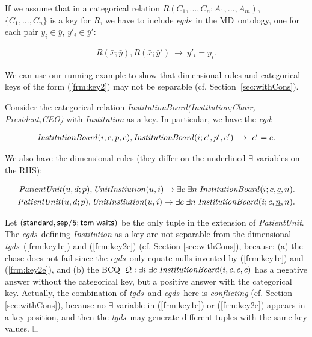 \documentclass[format=acmsmall, review=false, screen=true]{acmart}
\newcommand{\bcq}{BCQ}
\newcommand{\boxtheorem}{\ensuremath{\hfill \Box}}
\newcommand{\mc}[1]{\mathcal{ #1}}
\newcommand{\nit}[1]{{\it #1}}
\newcommand{\md}{MD}
\newcommand{\vectt}[1]{\bar{#1}}
\newcommand{\egds}{{\em egds}}
\newcommand{\egd}{{\em egd}}
\newcommand{\tgds}{{\em tgds}}
\begin{document}
 If we assume that in a categorical relation $R(C_1,...,C_n;A_1,...,A_m)$, \ $\{C_1,...,C_n\}$ is a key for $R$, we have to include  \egds \ in the \md \ ontology, one for each pair $y_i \in \vectt{y}$, $y'_i \in \vectt{y}'$:

\vspace{-4mm}
\begin{align}
R(\vectt{x};\vectt{y}),R(\vectt{x};\vectt{y}')~\rightarrow~ y'_i=y_i.\label{frm:key2}
\end{align}
\vspace{-4mm}



We can use our running example to show that dimensional rules and categorical keys of the form (\ref{frm:key2}) may  not be separable (cf. Section~\ref{sec:withCons}).

\begin{example} \label{ex:non-sep-ex}Consider the categorical relation \nit{InstitutionBoard(Institution;Chair,} \nit{President,CEO)} with \nit{Institution} as a key. In particular, we have the \egd:

\vspace{-4mm}
\begin{align*}
\nit{InstitutionBoard}(i;c,p,e),\nit{InstitutionBoard}(i;c',p',e')~\rightarrow~ c'=c.
\end{align*}
\vspace{-4mm}

We also have the dimensional rules (they differ on the underlined $\exists$-variables on the RHS):


\vspace{-4mm}
\begin{align}
\nit{PatientUnit}(u,d;p),\nit{UnitInstiution}(u,i) \rightarrow \exists c\;\exists n\;\nit{InstitutionBoard}(i;c,\underline{c},n).\label{frm:key1e}\\
\nit{PatientUnit}(u,d;p),\nit{UnitInstiution}(u,i) \rightarrow \exists c\;\exists n\;\nit{InstitutionBoard}(i;c,\underline{n},n).\label{frm:key2e}
\end{align}
\vspace{-4mm}

Let $({\sf standard},{\sf sep/5};{\sf tom\; waits})$ be the only tuple in the extension of \nit{PatientUnit}. The \egds \ defining \nit{Institution} as a key  are not separable from the dimensional \tgds \ (\ref{frm:key1e}) and (\ref{frm:key2e}) (cf. Section \ref{sec:withCons}), because: (a) the chase does not fail since the \egds \ only equate nulls invented by (\ref{frm:key1e}) and (\ref{frm:key2e}), and (b) the \bcq \ $\mc{Q}: \exists i\;\exists c\;\nit{InstitutionBoard}(i,c,c,c)$ has a negative answer without the categorical key, but a positive answer with the categorical key. Actually, the combination of \tgds \ and \egds \ here is {\em conflicting} (cf. Section \ref{sec:withCons}), because no $\exists$-variable in (\ref{frm:key1e}) or (\ref{frm:key2e}) appears in a key position, and then the \tgds \ may generate different tuples with the same key values. \boxtheorem \end{example}
\end{document}
